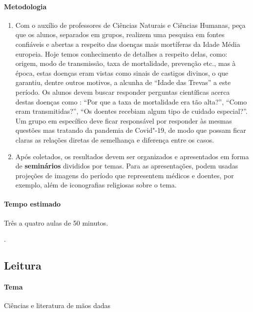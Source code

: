 \documentclass[12pt]{extarticle}
\begin{document}
 \paragraph{Metodologia}
 	\begin{enumerate}
 		\item
 		Com o auxílio de professores de Ciências Naturais e Ciências Humanas,
 		peça que os alunos, separados em grupos, realizem uma pesquisa em fontes confiáveis
 		e abertas a respeito das doenças mais mortíferas da Idade Média europeia. 
 		Hoje temos conhecimento de detalhes a respeito delas, como: origem, modo
 		de transmissão, taxa de mortalidade, prevenção etc., mas à época, estas
 		doenças eram vistas como sinais de castigos divinos, o que garantiu, dentre outros
 		motivos, a alcunha de ``Idade das Trevas'' a este período. Os alunos devem 
 		buscar responder perguntas científicas acerca destas doenças como : ``Por que
 		a taxa de mortalidade era tão alta?'', ``Como eram transmitidas?'', ``Os doentes
 		recebiam algum tipo de cuidado especial?''. Um grupo em específico deve
 		ficar responsável por responder às mesmas questões mas tratando da pandemia
 		de Covid"-19, de modo que possam ficar claras as relações diretas de semelhança
 		e diferença entre os casos.
 		\item
 		Após coletados, os resultados devem ser organizados e apresentados em forma 
 		de \textbf{seminários} divididos por temas. Para as apresentações, podem usadas
 		projeções de imagens do período que representem médicos e doentes, por exemplo,
 		além de iconografias religiosas sobre o tema.
 	\end{enumerate}

 \paragraph{Tempo estimado} Três a quatro aulas de 50 minutos.

.


\subsection{Leitura}

 \paragraph{Tema} Ciências e literatura de mãos dadas
\end{document}
